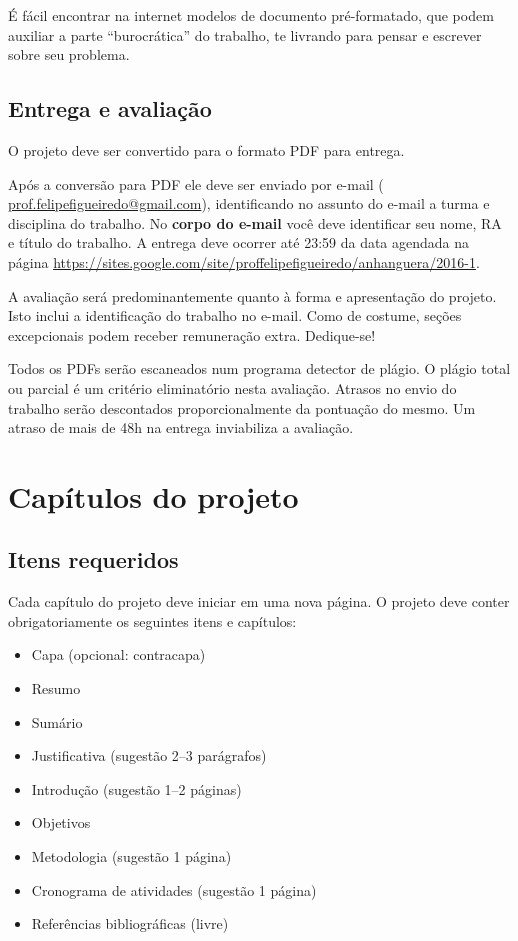 \documentclass[a4paper]{article}
\begin{document}
É fácil encontrar na internet modelos de documento pré-formatado, que podem auxiliar a parte ``burocrática'' do trabalho, te livrando para pensar e escrever sobre seu problema.

\subsection{Entrega e avaliação}

O projeto deve ser convertido para o formato PDF para entrega.

Após a conversão para PDF ele deve ser enviado por e-mail ( \url{prof.felipefigueiredo@gmail.com}), identificando no assunto do e-mail a turma e disciplina do trabalho.
No {\bf corpo do e-mail} você deve identificar seu nome, RA e título do trabalho.
A entrega deve ocorrer até 23:59 da data agendada na página \url{https://sites.google.com/site/proffelipefigueiredo/anhanguera/2016-1}.

A avaliação será predominantemente quanto à forma e apresentação do projeto.
Isto inclui a identificação do trabalho no e-mail.
Como de costume, seções excepcionais podem receber remuneração extra.
Dedique-se!

Todos os PDFs serão escaneados num programa detector de plágio.
O plágio total ou parcial é um critério eliminatório nesta avaliação.
Atrasos no envio do trabalho serão descontados proporcionalmente da pontuação do mesmo.
Um atraso de mais de 48h na entrega inviabiliza a avaliação.

\section{Capítulos do projeto}

\subsection{Itens requeridos}

Cada capítulo do projeto deve iniciar em uma nova página.
O projeto deve conter obrigatoriamente os seguintes itens e capítulos:

\begin{itemize}
\item Capa (opcional: contracapa)
\item Resumo
\item Sumário
\item Justificativa (sugestão 2--3 parágrafos)
\item Introdução (sugestão 1--2 páginas)
\item Objetivos
\item Metodologia (sugestão 1 página)
\item Cronograma de atividades (sugestão 1 página)
\item Referências bibliográficas (livre)
\end{itemize}
\end{document}
